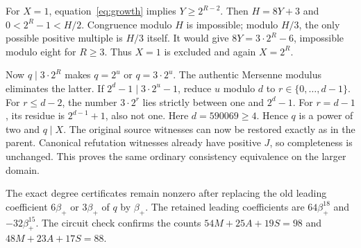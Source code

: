 For $X=1$, equation~\eqref{eq:growth} implies $Y\ge2^{R-2}$.
Then $H=8Y+3$ and $0<2^R-1<H/2$. Congruence modulo $H$ is impossible;
modulo $H/3$, the only possible positive multiple is $H/3$ itself.
It would give $8Y=3\cdot2^R-6$, impossible modulo eight for $R\ge3$.
Thus $X=1$ is excluded and again $X=2^R$.

Now $q\mid3\cdot2^R$ makes $q=2^u$ or $q=3\cdot2^u$.
The authentic Mersenne modulus eliminates the latter. If
$2^d-1\mid3\cdot2^u-1$, reduce $u$ modulo $d$ to $r\in\{0,\ldots,d-1\}$.
For $r\le d-2$, the number $3\cdot2^r$ lies strictly between one and
$2^d-1$. For $r=d-1$, its residue is $2^{d-1}+1$, also not one.
Here $d=590069\ge4$. Hence $q$ is a power of two and $q\mid X$.
The original source witnesses can now be restored exactly as in the
parent. Canonical refutation witnesses already have positive $J$, so
completeness is unchanged. This proves the same ordinary consistency
equivalence on the larger domain.

The exact degree certificates remain nonzero after replacing the old
leading coefficient $6\beta_+$ or $3\beta_+$ of $q$ by $\beta_+$.
The retained leading coefficients are $64\beta_+^{18}$ and
$-32\beta_+^{15}$. The circuit check confirms the counts
$54M+25A+19S=98$ and $48M+23A+17S=88$.

